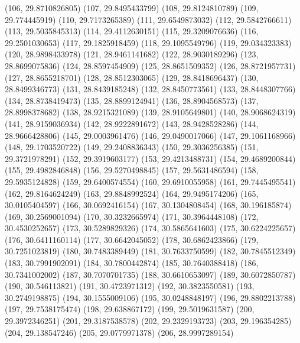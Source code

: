 {					(106, 29.8710826805)
					(107, 29.8495433799)
					(108, 29.8124810789)
					(109, 29.774445919)
					(110, 29.7173265389)
					(111, 29.6549873032)
					(112, 29.5842766611)
					(113, 29.5035845313)
					(114, 29.4112630151)
					(115, 29.3209076636)
					(116, 29.2501030653)
					(117, 29.1825918459)
					(118, 29.1095549796)
					(119, 29.034323383)
					(120, 28.9898433978)
					(121, 28.9461141682)
					(122, 28.9030189296)
					(123, 28.8699075836)
					(124, 28.8597454909)
					(125, 28.8651509352)
					(126, 28.8721957731)
					(127, 28.8655218701)
					(128, 28.8512303065)
					(129, 28.8418696437)
					(130, 28.8499346773)
					(131, 28.8439185248)
					(132, 28.8450773561)
					(133, 28.8448307766)
					(134, 28.8738419473)
					(135, 28.8899124941)
					(136, 28.8904568573)
					(137, 28.8998378682)
					(138, 28.9215321089)
					(139, 28.9105649801)
					(140, 28.9068624319)
					(141, 28.9159036934)
					(142, 28.9222891672)
					(143, 28.9428528286)
					(144, 28.9666428806)
					(145, 29.0003961476)
					(146, 29.0490017066)
					(147, 29.1061168966)
					(148, 29.1703520722)
					(149, 29.2408836343)
					(150, 29.3036256385)
					(151, 29.3721978291)
					(152, 29.3919603177)
					(153, 29.4213488731)
					(154, 29.4689200844)
					(155, 29.4982846848)
					(156, 29.5270498845)
					(157, 29.5631486594)
					(158, 29.5935124828)
					(159, 29.6400574554)
					(160, 29.6910055958)
					(161, 29.7445495541)
					(162, 29.8164624249)
					(163, 29.8848992524)
					(164, 29.9495174206)
					(165, 30.0105404597)
					(166, 30.0692416154)
					(167, 30.1304808454)
					(168, 30.196185874)
					(169, 30.2569001094)
					(170, 30.3232665974)
					(171, 30.3964448108)
					(172, 30.4530252657)
					(173, 30.5289829326)
					(174, 30.5865641603)
					(175, 30.6224225657)
					(176, 30.6411160114)
					(177, 30.6642045052)
					(178, 30.6862423866)
					(179, 30.7251023819)
					(180, 30.7483389449)
					(181, 30.7633750599)
					(182, 30.7845512349)
					(183, 30.7991902091)
					(184, 30.7800442874)
					(185, 30.7640388418)
					(186, 30.7341002002)
					(187, 30.7070701735)
					(188, 30.6610653097)
					(189, 30.6072850787)
					(190, 30.546113821)
					(191, 30.4723971312)
					(192, 30.3823550581)
					(193, 30.2749198875)
					(194, 30.1555009106)
					(195, 30.0248848197)
					(196, 29.8802213788)
					(197, 29.7538175474)
					(198, 29.638867172)
					(199, 29.5019631587)
					(200, 29.3972346251)
					(201, 29.3187538578)
					(202, 29.2329193723)
					(203, 29.196354285)
					(204, 29.138547246)
					(205, 29.0779971378)
					(206, 28.9997289154)
}
